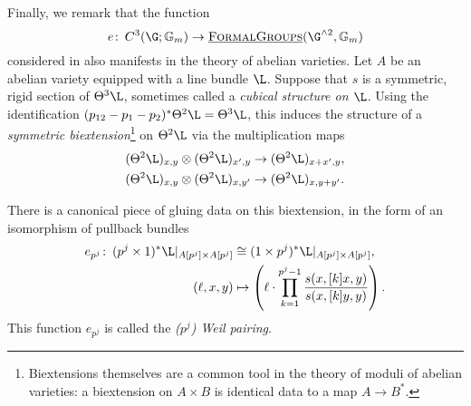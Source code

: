 Finally, we remark that the function \[e\co C^3(\G; \Gm) \to \InternalHom{FormalGroups}(\G^{\sm 2}, \Gm)\] considered in  also manifests in the theory of abelian varieties.  Let \(A\) be an abelian variety equipped with a line bundle \(\L\).  Suppose that \(s\) is a symmetric, rigid section of \(\Theta^3 \L\), sometimes called a \textit{cubical structure on \(\L\)}.  Using the identification \((p_{12} - p_1 - p_2)^* \Theta^2 \L = \Theta^3 \L\), this induces the structure of a \textit{symmetric biextension}\footnote{Biextensions themselves are a common tool in the theory of moduli of abelian varieties: a biextension on $A \times B$ is identical data to a map $A \to B^*$.} on \(\Theta^2 \L\) via the multiplication maps
\begin{align*}
(\Theta^2 \L)_{x, y} \otimes (\Theta^2 \L)_{x', y} & \to (\Theta^2 \L)_{x + x', y}, \\
(\Theta^2 \L)_{x, y} \otimes (\Theta^2 \L)_{x, y'} & \to (\Theta^2 \L)_{x, y + y'}.
\end{align*}

\begin{definition}
There is a canonical piece of gluing data on this biextension, in the form of an isomorphism of pullback bundles
\begin{align*}
e_{p^j}\co (p^j \times 1)^* \L|_{A[p^j] \times A[p^j]} & \cong (1 \times p^j)^* \L|_{A[p^j] \times A[p^j]}, \\
(\ell, x, y) & \mapsto \left(\ell \cdot \prod_{k=1}^{p^j-1} \frac{s(x, [k]x, y)}{s(x, [k]y, y)} \right).
\end{align*}
This function \(e_{p^j}\) is called the \textit{(\(p^j\)){\th} Weil pairing}.
\end{definition}

